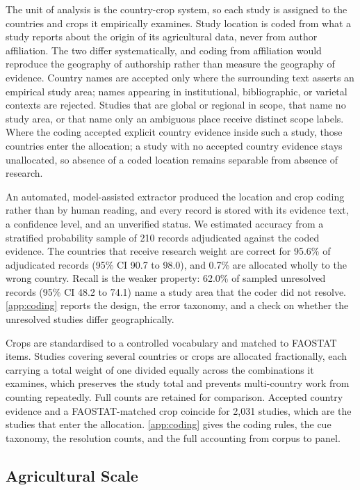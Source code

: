 \documentclass[ASNA,twocolumn]{USG}
\begin{document}
The unit of analysis is the country-crop system, so each study is assigned to the countries
and crops it empirically examines. Study location is coded from what a study reports about
the origin of its agricultural data, never from author affiliation. The two differ
systematically, and coding from affiliation would reproduce the geography of authorship
rather than measure the geography of evidence. Country names are accepted only where the
surrounding text asserts an empirical study area; names appearing in institutional,
bibliographic, or varietal contexts are rejected. Studies that are global or regional in scope, that name no study area, or that name only an
ambiguous place receive distinct scope labels. Where the coding accepted explicit
country evidence inside such a study, those countries enter the allocation; a study with no
accepted country evidence stays unallocated, so absence of a coded location remains separable
from absence of research.

An automated, model-assisted extractor produced the location and crop coding rather than
by human reading, and every record is stored with its evidence text, a confidence level, and an
unverified status. We estimated accuracy from a stratified probability sample of 210 records
adjudicated against the coded evidence. The countries that receive research weight are correct for 95.6\% of adjudicated records (95\% CI
90.7 to 98.0), and 0.7\% are allocated wholly to the wrong country. Recall is the weaker property: 62.0\% of sampled unresolved records (95\% CI 48.2
to 74.1) name a study area that the coder did not resolve. \ref{app:coding} reports the design,
the error taxonomy, and a check on whether the unresolved studies differ geographically.

Crops are standardised to a controlled vocabulary and matched to FAOSTAT items. Studies
covering several countries or crops are allocated fractionally, each carrying a total weight
of one divided equally across the combinations it examines, which preserves the study total
and prevents multi-country work from counting repeatedly. Full counts are retained for
comparison. Accepted country evidence and a FAOSTAT-matched crop coincide for 2,031 studies, which are
the studies that enter the allocation. \ref{app:coding} gives the coding rules, the cue
taxonomy, the resolution counts, and the full accounting from corpus to panel.

\subsection{Agricultural Scale}
\end{document}

